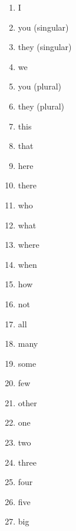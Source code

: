 \begin{enumerate}
\item   I 

\item   you (singular) 

\item   they (singular) 

\item   we 

\item   you (plural) 

\item   they (plural) 

\item   this 

\item   that 

\item   here 

\item   there 

\item   who 

\item   what 

\item   where 

\item   when 

\item   how 

\item   not 

\item   all 

\item   many 

\item   some 

\item   few 

\item   other 

\item   one 

\item   two 

\item   three 

\item   four 

\item   five 

\item   big 


\end{enumerate}

